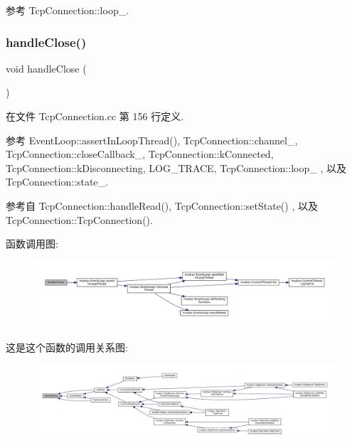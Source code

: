 参考 Tcp\+Connection\+::loop\+\_\+.

\mbox{\label{classmuduo_1_1TcpConnection_a2cb2baff35786f9caa991e3c47908d91}} 
\subsubsection{\texorpdfstring{handle\+Close()}{handleClose()}}
{\footnotesize\ttfamily void handle\+Close (\begin{DoxyParamCaption}{ }\end{DoxyParamCaption})\hspace{0.3cm}{\ttfamily [private]}}



在文件 Tcp\+Connection.\+cc 第 156 行定义.



参考 Event\+Loop\+::assert\+In\+Loop\+Thread(), Tcp\+Connection\+::channel\+\_\+, Tcp\+Connection\+::close\+Callback\+\_\+, Tcp\+Connection\+::k\+Connected, Tcp\+Connection\+::k\+Disconnecting, L\+O\+G\+\_\+\+T\+R\+A\+CE, Tcp\+Connection\+::loop\+\_\+ , 以及 Tcp\+Connection\+::state\+\_\+.



参考自 Tcp\+Connection\+::handle\+Read(), Tcp\+Connection\+::set\+State() , 以及 Tcp\+Connection\+::\+Tcp\+Connection().

函数调用图\+:
\nopagebreak
\begin{figure}[H]
\begin{center}
\leavevmode
\includegraphics[width=350pt]{classmuduo_1_1TcpConnection_a2cb2baff35786f9caa991e3c47908d91_cgraph}
\end{center}
\end{figure}
这是这个函数的调用关系图\+:
\nopagebreak
\begin{figure}[H]
\begin{center}
\leavevmode
\includegraphics[width=350pt]{classmuduo_1_1TcpConnection_a2cb2baff35786f9caa991e3c47908d91_icgraph}
\end{center}
\end{figure}
\mbox{\label{classmuduo_1_1TcpConnection_a70b275e63748ddd6da7d2171c540ccff}} 
